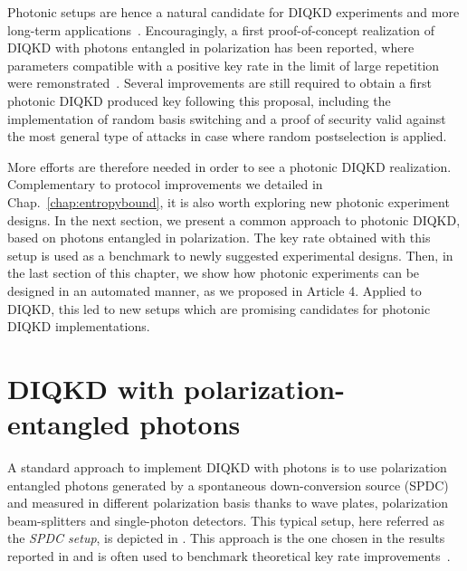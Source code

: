 \medbreak

Photonic setups are hence a natural candidate for DIQKD experiments and more long-term applications~\cite{Zapatero2023}.
Encouragingly, a first proof-of-concept realization of DIQKD with photons entangled in polarization has been reported, where parameters compatible with a positive key rate in the limit of large repetition were remonstrated~\cite{Liu2022}.
Several improvements are still required to obtain a first photonic DIQKD produced key following this proposal, including the implementation of random basis switching and a proof of security valid against the most general type of attacks in case where random postselection is applied. 

\medbreak

More efforts are therefore needed in order to see a photonic DIQKD realization. 
Complementary to protocol improvements we detailed in Chap.~\ref{chap:entropybound}, it is also worth exploring new photonic experiment designs.
In the next section, we present a common approach to photonic DIQKD, based on photons entangled in polarization.
The key rate obtained with this setup is used as a benchmark to newly suggested experimental designs.
Then, in the last section of this chapter, we show how photonic experiments can be designed in an automated manner, as we proposed in Article 4.
Applied to DIQKD, this led to new setups which are promising candidates for photonic DIQKD implementations.

\vspace{2cm}

\section{DIQKD with polarization-entangled photons}
\label{sec:PolarizationDIQKD}

A standard approach to implement DIQKD with photons is to use polarization entangled photons generated by a spontaneous down-conversion source (SPDC) and measured in different polarization basis thanks to wave plates, polarization beam-splitters and single-photon detectors.
This typical setup, here referred as the \textit{SPDC setup}, is depicted in .
This approach is the one chosen in the results reported in \cite{Liu2022} and is often used to benchmark theoretical key rate improvements~\cite{Ho2020,Sekatski2021}.

